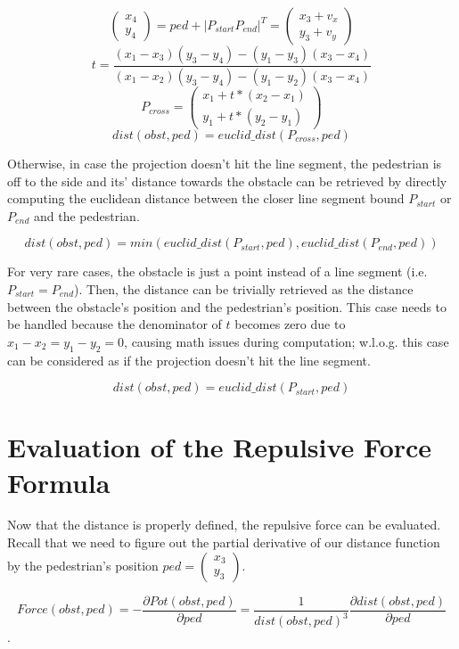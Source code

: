 \documentclass[fleqn]{article}
\begin{document}
$$\begin{pmatrix} x_4 \\ y_4 \end{pmatrix} = ped + |P_{start} P_{end}|^T = \begin{pmatrix} x_3 + v_x \\ y_3 + v_y \end{pmatrix}$$
$$t = \frac{(x_1 - x_3) (y_3 - y_4) - (y_1 - y_3) (x_3 - x_4)}{(x_1 - x_2) (y_3 - y_4) - (y_1 - y_2) (x_3 - x_4)}$$
$$P_{cross} = \begin{pmatrix} x_1 + t * (x_2 - x_1) \\ y_1 + t * (y_2 - y_1) \end{pmatrix}$$
$$dist(obst, ped) = euclid\_dist(P_{cross}, ped)$$

Otherwise, in case the projection doesn't hit the line segment, the pedestrian is off to
the side and its' distance towards the obstacle can be retrieved by directly
computing the euclidean distance between the closer line segment bound $P_{start}$ or $P_{end}$
and the pedestrian.

$$ dist(obst, ped) = min(euclid\_dist(P_{start}, ped), euclid\_dist(P_{end}, ped))$$

For very rare cases, the obstacle is just a point instead of a line segment (i.e. $P_{start} = P_{end}$).
Then, the distance can be trivially retrieved as the distance between the obstacle's
position and the pedestrian's position.
This case needs to be handled because the denominator of $t$ becomes zero due to
$x_1 - x_2 = y_1 - y_2 = 0$, causing math issues during computation;
w.l.o.g. this case can be considered as if the projection doesn't hit the line segment.

$$dist(obst, ped) = euclid\_dist(P_{start}, ped)$$

\section{Evaluation of the Repulsive Force Formula}

Now that the distance is properly defined, the repulsive force can be evaluated.
Recall that we need to figure out the partial derivative of our distance function
by the pedestrian's position $ped = \begin{pmatrix} x_3 \\ y_3 \end{pmatrix}$.

$$Force(obst, ped) = - \frac{\partial Pot(obst, ped)}{\partial ped} = \frac{1}{dist(obst, ped)^3} \frac{\partial dist(obst, ped)}{\partial ped}$$.
\end{document}
